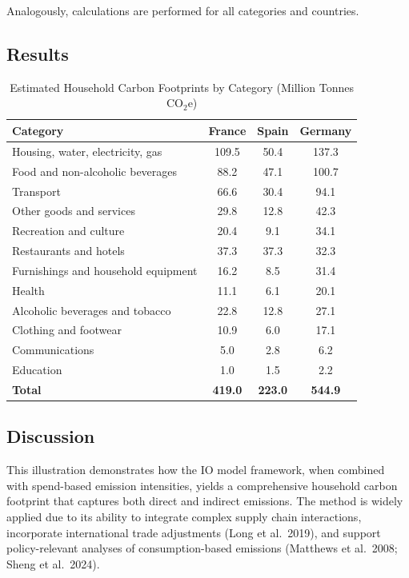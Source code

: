 \documentclass[12pt,a4paper]{article}%
\begin{document}
Analogously, calculations are performed for all categories and countries.

\subsection{Results}

\begin{table}[h]
\centering
\caption{Estimated Household Carbon Footprints by Category (Million Tonnes CO$_{2}$e)}\label{tab:results}
\begin{tabular}{@{}lccc@{}}
\toprule
\textbf{Category} & \textbf{France} & \textbf{Spain} & \textbf{Germany}\\
\midrule
Housing, water, electricity, gas & 109.5 & 50.4 & 137.3\\
Food and non-alcoholic beverages & 88.2 & 47.1 & 100.7\\
Transport & 66.6 & 30.4 & 94.1\\
Other goods and services & 29.8 & 12.8 & 42.3\\
Recreation and culture & 20.4 & 9.1 & 34.1\\
Restaurants and hotels & 37.3 & 37.3 & 32.3\\
Furnishings and household equipment & 16.2 & 8.5 & 31.4\\
Health & 11.1 & 6.1 & 20.1\\
Alcoholic beverages and tobacco & 22.8 & 12.8 & 27.1\\
Clothing and footwear & 10.9 & 6.0 & 17.1\\
Communications & 5.0 & 2.8 & 6.2\\
Education & 1.0 & 1.5 & 2.2\\
\midrule
\textbf{Total} & \textbf{419.0} & \textbf{223.0} & \textbf{544.9}\\
\bottomrule
\end{tabular}
\end{table}

\subsection{Discussion}

This illustration demonstrates how the IO model framework, when combined with spend-based emission intensities, yields a comprehensive household carbon footprint that captures both direct and indirect emissions. The method is widely applied due to its ability to integrate complex supply chain interactions, incorporate international trade adjustments (Long et al.~2019), and support policy-relevant analyses of consumption-based emissions (Matthews et al.~2008; Sheng et al.~2024).
\end{document}
